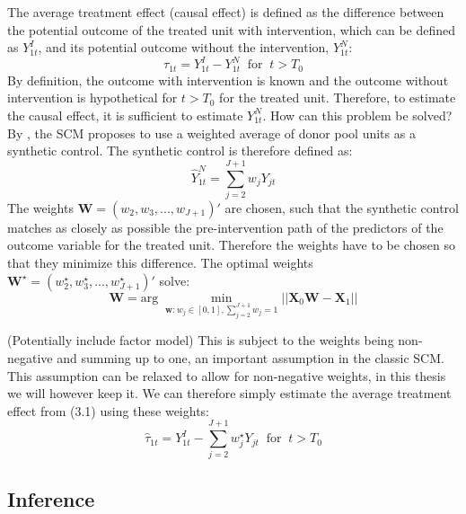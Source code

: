 \documentclass{scrbook}
\begin{document}
The average treatment effect (causal effect) is defined as the
difference between the potential outcome of the treated unit with
intervention, which can be defined as \(Y_{1t}^{I}\), and its potential
outcome without the intervention, \(Y_{1t}^{N}\): \begin{equation}
\tau_{1t}=Y_{1t}^{I}-Y_{1t}^{N}\; \; \text{for}\; \; t>T_{0}
\end{equation} By definition, the outcome with intervention is known and
the outcome without intervention is hypothetical for \(t>T_{0}\) for the
treated unit. Therefore, to estimate the causal effect, it is sufficient
to estimate \(Y_{1t}^{N}\). How can this problem be solved? By
\textcite{abadie_economic_2003}, the SCM proposes to use a weighted
average of donor pool units as a synthetic control. The synthetic
control is therefore defined as: \begin{equation}
\hat{Y}_{1t}^{N}=\sum_{j=2}^{J+1} w_{j}Y_{jt}
\end{equation} The weights \(\mathbf{W}=(w_{2},w_{3},...,w_{J+1})'\) are
chosen, such that the synthetic control matches as closely as possible
the pre-intervention path of the predictors of the outcome variable for
the treated unit. Therefore the weights have to be chosen so that they
minimize this difference. The optimal weights
\(\mathbf{W}^{\star}=(w_{2}^{\star},w_{3}^{\star},...,w_{J+1}^{\star})'\)
solve: \begin{equation}
\mathbf{W}=\text{arg}\; \min_{\mathbf{w}:w_{j}\in[0,1],\sum_{j=2}^{J+1} w_{j}=1}\vert\vert\mathbf{X}_{0}\mathbf{W}-\mathbf{X}_{1}\vert\vert
\end{equation}

(Potentially include factor model) This is subject to the weights being
non-negative and summing up to one, an important assumption in the
classic SCM. This assumption can be relaxed to allow for non-negative
weights, in this thesis we will however keep it. We can therefore simply
estimate the average treatment effect from (3.1) using these weights:
\begin{equation}
\hat{\tau}_{1t}=Y_{1t}^{I}-\sum_{j=2}^{J+1} w_{j}^{\star}Y_{jt}\; \; \text{for}\; \; t>T_{0}
\end{equation}

\subsection*{Inference}
\end{document}
